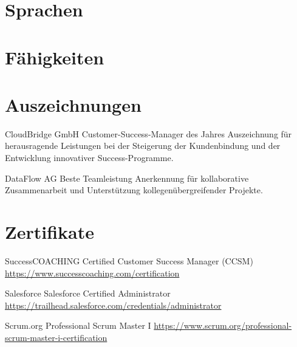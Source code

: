 \documentclass[a4paper, serif, 10pt]{moderncv}
\begin{document}
\section{Sprachen}

\section{Fähigkeiten}

\section{Auszeichnungen}

        {CloudBridge GmbH}
        {Customer-Success-Manager des Jahres}
        {}
        {}
        {Auszeichnung für herausragende Leistungen bei der Steigerung der Kundenbindung und der Entwicklung innovativer Success-Programme.}

        {DataFlow AG}
        {Beste Teamleistung}
        {}
        {}
        {Anerkennung für kollaborative Zusammenarbeit und Unterstützung kollegenübergreifender Projekte.}
\section{Zertifikate}

        {SuccessCOACHING}
        {Certified Customer Success Manager (CCSM)}
        {\url{https://www.successcoaching.com/certification}}
        {}
        {}

        {Salesforce}
        {Salesforce Certified Administrator}
        {\url{https://trailhead.salesforce.com/credentials/administrator}}
        {}
        {}

        {Scrum.org}
        {Professional Scrum Master I}
        {\url{https://www.scrum.org/professional-scrum-master-i-certification}}
        {}
        {}
\end{document}
